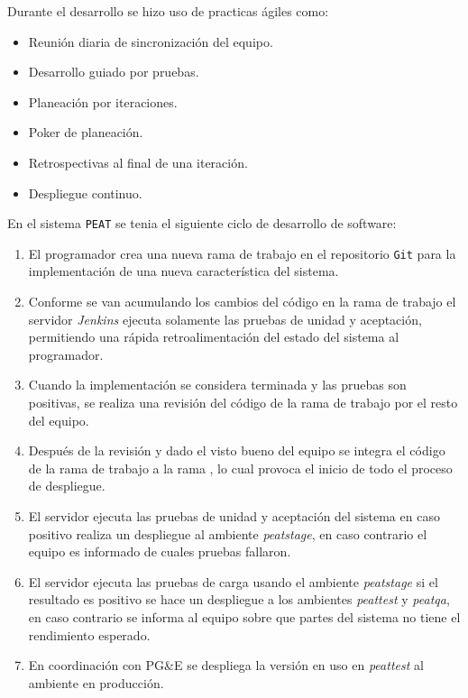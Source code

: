 Durante el desarrollo se hizo uso de practicas ágiles como:

\begin{itemize}
  \item Reunión diaria de sincronización del equipo.
  \item Desarrollo guiado por pruebas.
  \item Planeación por iteraciones.
  \item Poker de planeación.
  \item Retrospectivas al final de una iteración.
  \item Despliegue continuo.
\end{itemize}

En el sistema \texttt{PEAT} se tenia el siguiente ciclo de desarrollo de
software:

\begin{enumerate}
\item El programador crea una nueva rama de trabajo en el repositorio \texttt{Git}
  para la implementación de una nueva característica del sistema.
\item Conforme se van acumulando los cambios del código en la rama de trabajo
  el servidor \textit{Jenkins} ejecuta solamente las pruebas de unidad y aceptación,
  permitiendo una rápida retroalimentación del estado del sistema al programador.
\item Cuando la implementación se considera terminada y las pruebas son positivas,
  se realiza una revisión del código de la rama de trabajo por el resto del
  equipo.
\item Después de la revisión y dado el visto bueno del equipo se integra el
  código de la rama de trabajo a la rama , lo cual provoca el
  inicio de todo el proceso de despliegue.
\item El servidor ejecuta las pruebas de unidad y aceptación del sistema en
  caso positivo realiza un despliegue al ambiente \textit{peatstage}, en caso
  contrario el equipo es informado de cuales pruebas fallaron.
\item El servidor ejecuta las pruebas de carga usando el ambiente \textit{peatstage}
  si el resultado es positivo se hace un despliegue a los ambientes \textit{peattest}
  y \textit{peatqa}, en caso contrario se informa al equipo sobre que partes del
  sistema no tiene el rendimiento esperado.
\item En coordinación con PG\&E se despliega la versión en uso en \textit{peattest}
  al ambiente en producción.
\end{enumerate}

